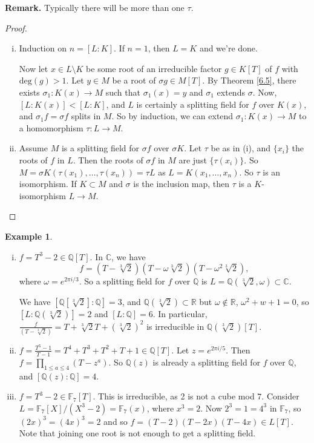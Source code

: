 \documentclass{article}
\theoremstyle{definition}
\newtheorem{example}{Example}[section]
\begin{document}
\textbf{Remark.} Typically there will be more than one $\tau$.

\begin{proof}
    \begin{enumerate}[(i)]
        \item Induction on $n = [L:K]$. If $n=1$, then $L=K$ and we're done.
        
        Now let $x \in L \setminus K$ be some root of an irreducible factor $g \in K[T]$ of $f$ with $\text{deg}(g)>1$. Let $y \in M$ be a root of $\sigma g \in M[T]$. By Theorem \ref{6.5}, there exists $\sigma_1 : K(x) \to M$ such that $\sigma_1(x) = y$ and $\sigma_1$ extends $\sigma.$ Now, $[L : K(x)] < [L : K]$, and $L$ is certainly a splitting field for $f$ over $K(x)$, and $\sigma_1 f =\sigma f$ splits in $M$. So by induction, we can extend $\sigma_1 : K(x) \to M$ to a homomorphism $\tau : L \to M$.
        \item Assume $M$ is a splitting field for $\sigma f$ over $\sigma K$. Let $\tau$ be as in (i), and $\{x_i\}$ the roots of $f$ in $L$. Then the roots of $\sigma f$ in $M$ are just $\{\tau(x_i)\}$. So $M = \sigma K (\tau(x_1),\ldots,\tau(x_n)) = \tau L$ as $L = K(x_1,\ldots,x_n)$. So $\tau$ is an isomorphism. If $K \subset M$ and $\sigma$ is the inclusion map, then $\tau$ is a $K$-isomorphism $L \to M$. 
    \end{enumerate}
\end{proof}
\begin{example}
    \begin{enumerate}[(i)]
        \item $f = T^3-2 \in \mathbb{Q}[T]$. In $\mathbb{C}$, we have $$f=(T-\sqrt[3]{2})(T-\omega \sqrt[3]{2})(T-\omega^2\sqrt[3]{2}),$$ where $\omega = e^{2 \pi i /3}$. So a splitting field for $f$ over $\mathbb{Q}$ is $L=\mathbb{Q}(\sqrt[3]{2}, \omega) \subset \mathbb{C}$. 
        
        We have $[\mathbb{Q}[\sqrt[3]{2}] : \mathbb{Q}] = 3$, and $\mathbb{Q}(\sqrt[3]{2}) \subset \mathbb{R}$ but $\omega \not\in \mathbb{R}$, $\omega^2+w+1=0$, so $[L : \mathbb{Q}(\sqrt[3]{2})] = 2$ and $[L:\mathbb{Q}]=6$. In particular, $\frac{f}{(T-\sqrt[3]{2})}=T+\sqrt[3]{2}T+(\sqrt[3]{2})^2$ is irreducible in $\mathbb{Q}(\sqrt[3]{2})[T].$
        \item $f = \frac{T^5-1}{T-1} = T^4 + T^3+T^2+T+1 \in \mathbb{Q}[T]$. Let $z = e^{2\pi i/5}$. Then $f = \prod_{1\le a\le 4}^{} (T-z^{a})$. So $\mathbb{Q}(z)$ is already a splitting field for $f$ over $\mathbb{Q}$, and $[\mathbb{Q}(z):\mathbb{Q}]=4$.
        \item $f = T^3-2 \in \mathbb{F}_7[T]$. This is irreducible, as 2 is not a cube mod $7$. Consider $L=\mathbb{F}_7[X]/(X^3-2) = \mathbb{F}_7(x)$, where $x^3=2$. Now $2^3=1=4^3$ in $\mathbb{F}_7$, so $(2x)^3=(4x)^3=2$ and so $f = (T-2)(T-2x)(T-4x) \in L[T]$. Note that joining one root is not enough to get a splitting field.
    \end{enumerate}
\end{example}
\end{document}
